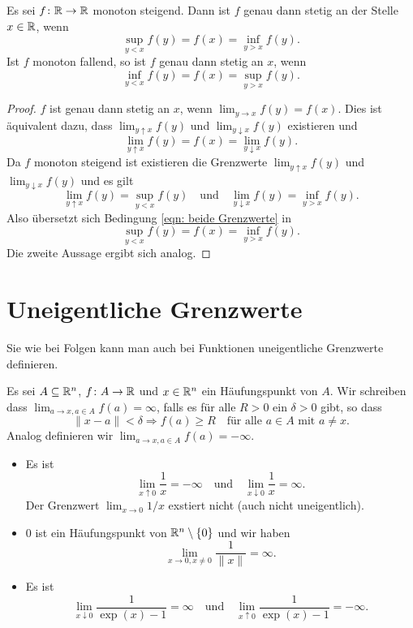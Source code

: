 \documentclass[a4paper,10pt]{article}
\begin{document}
\begin{kor}
 Es sei $f \colon \mathbb{R} \to \mathbb{R}$ monoton steigend. Dann ist $f$ genau dann stetig an der Stelle $x \in \mathbb{R}$, wenn
 \[
  \sup_{y < x} f(y) = f(x) = \inf_{y > x} f(y).
 \]
 Ist $f$ monoton fallend, so ist $f$ genau dann stetig an $x$, wenn
 \[
  \inf_{y < x} f(y) = f(x) = \sup_{y > x} f(y).
 \]
\end{kor}
\begin{proof}
 $f$ ist genau dann stetig an $x$, wenn $\lim_{y \to x} f(y) = f(x)$. Dies ist äquivalent dazu, dass $\lim_{y \uparrow x} f(y)$ und $\lim_{y \downarrow x} f(y)$ existieren und
 \begin{equation}\label{eqn: beide Grenzwerte}
  \lim_{y \uparrow x} f(y) = f(x) = \lim_{y \downarrow x} f(y).
 \end{equation}
 Da $f$ monoton steigend ist existieren die Grenzwerte $\lim_{y \uparrow x} f(y)$ und $\lim_{y \downarrow x} f(y)$ und es gilt
 \[
  \lim_{y \uparrow x} f(y) = \sup_{y < x} f(y)
  \quad
  \text{und}
  \quad
  \lim_{y \downarrow x} f(y) = \inf_{y > x} f(y).
 \]
 Also übersetzt sich Bedingung \eqref{eqn: beide Grenzwerte} in
 \[
  \sup_{y < x} f(y) = f(x) = \inf_{y > x} f(y).
 \]
 Die zweite Aussage ergibt sich analog.
\end{proof}





\section{Uneigentliche Grenzwerte}
Sie wie bei Folgen kann man auch bei Funktionen uneigentliche Grenzwerte definieren.


\begin{defi}
 Es sei $A \subseteq \mathbb{R}^n$, $f \colon A \to \mathbb{R}$ und $x \in \mathbb{R}^n$ ein Häufungspunkt von $A$. Wir schreiben dass $\lim_{a \to x, a \in A} f(a) = \infty$, falls es für alle $R > 0$ ein $\delta > 0$ gibt, so dass
 \[
  \|x-a\| < \delta \Rightarrow f(a) \geq R \quad \text{für alle $a \in A$ mit $a \neq x$}.
 \]
 Analog definieren wir $\lim_{a \to x, a \in A} f(a) = -\infty.$
\end{defi}


\begin{bsp}
 \begin{itemize}
  \item
   Es ist
   \[
    \lim_{x \uparrow 0} \frac{1}{x} = -\infty
    \quad
    \text{und}
    \quad
    \lim_{x \downarrow 0} \frac{1}{x} = \infty.
   \]
   Der Grenzwert $\lim_{x \to 0} 1/x$ exstiert nicht (auch nicht uneigentlich).
  \item
   $0$ ist ein Häufungspunkt von $\mathbb{R}^n \setminus \{0\}$ und wir haben
   \[
    \lim_{x \to 0, x \neq 0} \frac{1}{\|x\|} = \infty.
   \]
  \item
   Es ist
   \[
    \lim_{x \downarrow 0} \frac{1}{\exp(x) - 1} = \infty
    \quad
    \text{und}
    \quad
    \lim_{x \uparrow 0} \frac{1}{\exp(x) - 1} = -\infty.
   \]
 \end{itemize}
\end{bsp}
\end{document}
